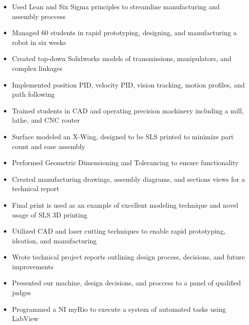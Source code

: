 \documentclass{resume}
\begin{document}
\begin{itemize}
  \item Used Lean and Six Sigma principles to streamline manufacturing and assembly proccess
  \item Managed 60 students in rapid prototyping, designing, and manufacturing a robot in six weeks
  \item Created top-down Solidworks models of transmissions, manipulators, and complex linkages
  \item Implemented position PID, velocity PID, vision tracking, motion profiles, and path following
  \item Trained students in CAD and operating precision machinery including a mill, lathe, and CNC router
\end{itemize}

\begin{itemize}
  \item Surface modeled an X-Wing, designed to be SLS printed to minimize part count and ease assembly
  \item Performed Geometric Dimensioning and Tolerancing to ensure functionality
  \item Created manufacturing drawings, assembly diagrams, and sections views for a technical report
  \item Final print is used as an example of excellent modeling technique and novel usage of SLS 3D printing
\end{itemize}

\begin{itemize}
  \item Utilized CAD and laser cutting techniques to enable rapid prototyping, ideation, and manufacturing
  \item Wrote technical project reports outlining design process, decisions, and future improvements
  \item Presented our machine, design decisions, and proccess to a panel of qualified judges
  \item Programmed a NI myRio to execute a system of automated tasks using LabView
\end{itemize}
\end{document}
